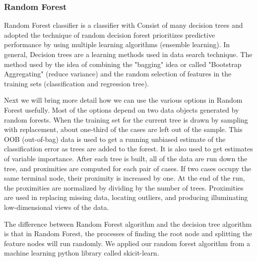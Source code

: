 \documentclass[10pt,twocolumn]{article}
\begin{document}
\subsubsection{Random Forest}
Random Forest classifier is a classifier with Consist of many decision trees and adopted the technique of random decision forest prioritizes predictive performance by using multiple learning algorithms (ensemble learning). In general, Decision trees are a learning methods used in data search technique. The method used by the idea of combining the "bagging" idea or called "Bootstrap Aggregating" (reduce variance) and the random selection of features in the training sets (classification and regression tree). 
\par
Next we will bring more detail how we can use the various options in Random Forest usefully. Most of the options depend on two data objects generated by random forests. When the training set for the current tree is drawn by sampling with replacement, about one-third of the cases are left out of the sample. This OOB (out-of-bag) data is used to get a running unbiased estimate of the classification error as trees are added to the forest. It is also used to get estimates of variable importance. After each tree is built, all of the data are run down the tree, and proximities are computed for each pair of cases. If two cases occupy the same terminal node, their proximity is increased by one. At the end of the run, the proximities are normalized by dividing by the number of trees. Proximities are used in replacing missing data, locating outliers, and producing illuminating low-dimensional views of the data.
\par 
The difference between Random Forest algorithm and the decision tree algorithm is that in Random Forest, the processes of finding the root node and splitting the feature nodes will run randomly. We applied our random forest algorithm from a machine learning python library called skicit-learn\cite{pedregosa2011scikit}.
\end{document}
